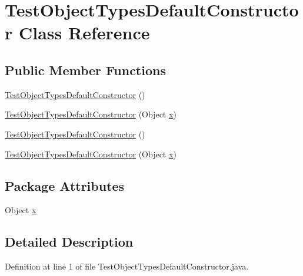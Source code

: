 \hypertarget{classTestObjectTypesDefaultConstructor}{
\section{TestObjectTypesDefaultConstructor Class Reference}
\label{classTestObjectTypesDefaultConstructor}
}
\subsection*{Public Member Functions}
\begin{DoxyCompactItemize}
\item 
\hyperlink{classTestObjectTypesDefaultConstructor_a552552232508281b3b533cbed63af714}{TestObjectTypesDefaultConstructor} ()
\item 
\hyperlink{classTestObjectTypesDefaultConstructor_ac80b40cf3e8f70fab9cba0d55d1aacfd}{TestObjectTypesDefaultConstructor} (Object \hyperlink{classTestObjectTypesDefaultConstructor_a17225e974edbb85ef0f11433556ad3ad}{x})
\item 
\hyperlink{classTestObjectTypesDefaultConstructor_a552552232508281b3b533cbed63af714}{TestObjectTypesDefaultConstructor} ()
\item 
\hyperlink{classTestObjectTypesDefaultConstructor_ac80b40cf3e8f70fab9cba0d55d1aacfd}{TestObjectTypesDefaultConstructor} (Object \hyperlink{classTestObjectTypesDefaultConstructor_a17225e974edbb85ef0f11433556ad3ad}{x})
\end{DoxyCompactItemize}
\subsection*{Package Attributes}
\begin{DoxyCompactItemize}
\item 
Object \hyperlink{classTestObjectTypesDefaultConstructor_a17225e974edbb85ef0f11433556ad3ad}{x}
\end{DoxyCompactItemize}


\subsection{Detailed Description}


Definition at line 1 of file TestObjectTypesDefaultConstructor.java.



